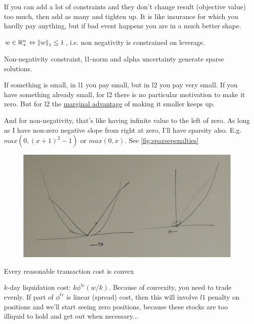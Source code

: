 \begin{idea}
	If you can add a lot of constraints and they don't change result (objective value) too much, then add as many and tighten up. It is like insurance for which you hardly pay anything, but if bad event happens you are in a much better shape.
\end{idea}

\begin{idea}
	$w \in \mathbb{R}_{+}^n \Leftrightarrow \left\| w \right\|_1 \le 1$, i.e. non negativity is constrained on leverage.
\end{idea}

\begin{idea}
	Non-negativity constraint, l1-norm and alpha uncertainty generate sparse solutions.
	
	If something is small, in l1 you pay small, but in l2 you pay very small. If you have something already small, for l2 there is no particular motivation to make it zero. But for l2 the \underline{marginal advantage} of making it smaller keeps up.
	
	And for non-negativity, that's like having infinite value to the left of zero. As long as I have non-zero negative slope from right at zero, I'll have sparsity also. E.g. $max(0, (x+1)^2 - 1)$ or $max(0, x)$. See \autoref{fig:sparsepenalties} 
	
	\begin{figure}[h]
		\centering
		\includegraphics[width=0.7\linewidth]{img/sparse_penalties}
		\caption{}
		\label{fig:sparsepenalties}
	\end{figure}
	
\end{idea}

\begin{idea}
	Every reasonable transaction cost is convex
\end{idea}

\begin{idea}
	$k$-day liquidation cost: $k\phi^{tc}(w/k)$. Because of convexity, you need to trade evenly. If part of $\phi^{tc}$ is linear (spread) cost, then this will involve $l1$ penalty on positions and we'll start seeing zero positions, because these stocks are too illiquid to hold and get out when necessary...
\end{idea}

